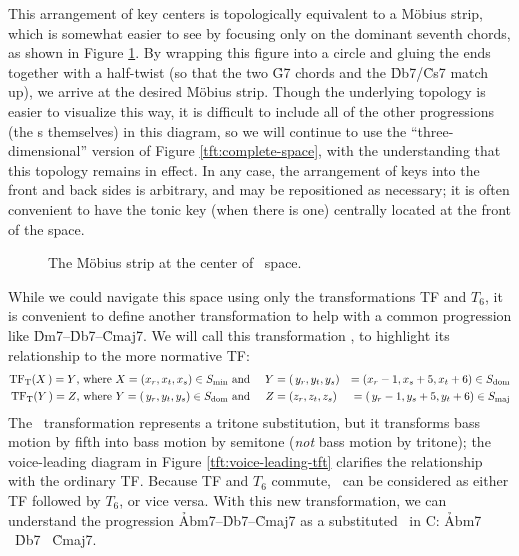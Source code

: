 This arrangement of key centers is topologically equivalent to a Möbius strip,
which is somewhat easier to see by focusing only on the dominant seventh
chords, as shown in Figure \ref{tft:mobius-dominants}. By wrapping this figure
into a circle and gluing the ends together with a half-twist (so that the two
\h{G7} chords and the \h{Db7}/\h{Cs7} match up), we arrive at the desired Möbius strip. Though
the underlying topology is easier to visualize this way, it is difficult to
include all of the other progressions (the \tf{}s themselves) in this diagram,
so we will continue to use the ``three-dimensional'' version of Figure
\ref{tft:complete-space}, with the understanding that this topology remains in
effect. In any case, the arrangement of keys into the front and back sides is
arbitrary, and may be repositioned as necessary; it is often convenient to
have the tonic key (when there is one) centrally located at the front of the
space.

\begin{figure}[htbp]
  \caption{The Möbius strip at the center of \tf\ space.}
  \label{tft:mobius-dominants}
\end{figure}

While we could navigate this space using only the transformations TF and
$T_6$, it is convenient to define another transformation to help with a common
progression like \h{Dm7}--\h{Db7}--\h{Cmaj7}. We will call this
transformation \tft, to highlight its relationship to the more normative TF:%
%
\begin{alignat*}{3}
    \mathrm{TF}_\mathrm{T}(X\,) = Y\text{, where}\ X = (x_r, x_t, x_s) \in S_{\mathrm{min}}
    & \text{ and}\ &
    Y &= (\,y_r, y_t, y_s) &= (x_r - 1, x_s + 5, x_t + 6) \in S_{\mathrm{dom}} \\
    \mathrm{TF}_\mathrm{T}(Y\,) = Z\text{, where}\ Y = (\,y_r, y_t, y_s) \in S_{\mathrm{dom}}
    & \text{ and} &
    Z &= (z_r, z_t, z_s) &= (\,y_r - 1, y_s + 5, y_t + 6) \in S_{\mathrm{maj}}
\end{alignat*}%
%
The \tft\ transformation represents a tritone substitution, but it
transforms bass motion by fifth into bass motion by semitone (\emph{not} bass
motion by tritone); the voice-leading diagram in Figure
\ref{tft:voice-leading-tft} clarifies the relationship with the ordinary TF. Because TF and $T_6$ commute,
\tft\ can be considered as either TF followed by $T_6$, or vice versa. With
this new transformation, we can understand the progression
\h{Abm7}--\h{Db7}--\h{Cmaj7} as a substituted \tfo\ in C: \h{Abm7} \TFarrow\
\h{Db7} \TFTarrow\ \h{Cmaj7}.

